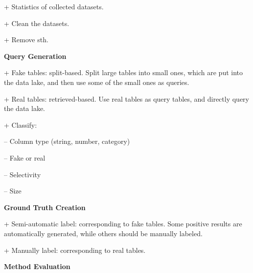 
+ Statistics of collected datasets.

+ Clean the datasets.

+ Remove sth.



\noindent\textbf{Query Generation}

+ Fake tables: split-based. Split large tables into small ones, which are put into the data lake, and then use some of the small ones as queries.

+ Real tables: retrieved-based. Use real tables as query tables, and directly query the data lake.


+ Classify: 

\quad\quad -- Column type (string, number, category)
 
\quad\quad -- Fake or real
  
\quad\quad -- Selectivity

\quad\quad -- Size

\noindent\textbf{Ground Truth Creation}

+ Semi-automatic label: corresponding to fake tables. Some positive results are automatically generated, while others should be manually labeled.

+ Manually label: corresponding to real tables.

\noindent\textbf{Method Evaluation} 



